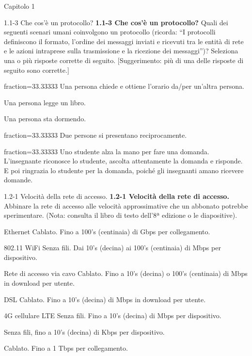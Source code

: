 \documentclass[a4paper]{article}
\begin{document}
\begin{quiz}{Capitolo 1}


\begin{multi}[points=1,shuffle=true,multiple]{1.1-3 Che cos'è un protocollo?}
\textbf{1.1-3 Che cos'è un protocollo?}
Quali dei seguenti scenari umani coinvolgono un protocollo
(ricorda: ``I protocolli definiscono il formato, l'ordine dei messaggi inviati e ricevuti tra le entità di rete e le azioni intraprese sulla trasmissione e la ricezione dei messaggi'')?
Seleziona una o più risposte corrette di seguito. [Suggerimento: più di una delle risposte di seguito sono corrette.]

\item[fraction=33.33333] Una persona chiede e ottiene l'orario da/per un'altra persona.
\item Una persona legge un libro.
\item Una persona sta dormendo.
\item[fraction=33.33333] Due persone si presentano reciprocamente.
\item[fraction=33.33333] Uno studente alza la mano per fare una domanda. L'insegnante riconosce lo studente, ascolta attentamente la domanda e risponde. E poi ringrazia lo studente per la domanda, poiché gli insegnanti amano ricevere domande.
\end{multi}

\begin{matching}[points=1,shuffle=true]{1.2-1 Velocità della rete di accesso.}
\textbf{1.2-1 Velocità della rete di accesso.}
Abbinare la rete di accesso alle velocità approssimative che un abbonato potrebbe sperimentare.
(Nota: consulta il libro di testo dell'8ª edizione o le diapositive).

\item Ethernet \answer Cablato. Fino a 100's (centinaia) di Gbps per collegamento.
\item 802.11 WiFi \answer Senza fili. Dai 10's (decina) ai 100's (centinaia) di Mbps per dispositivo.
\item Rete di accesso via cavo \answer Cablato. Fino a 10's (decina) o 100's (centinaia) di Mbps in download per utente.
\item DSL \answer Cablato. Fino a 10's (decina) di Mbps in download per utente.
\item 4G cellulare LTE \answer Senza fili. Fino a 10's (decina) di Mbps per dispositivo.
\item \answer Senza fili, fino a 10's (decina) di Kbps per dispositivo.
\item \answer Cablato. Fino a 1 Tbps per collegamento.
\end{matching}


\end{quiz}
\end{document}
